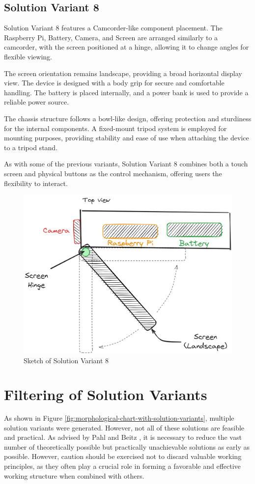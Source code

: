\subsection{Solution Variant 8}
Solution Variant 8 features a Camcorder-like component placement. The Raspberry Pi, Battery, Camera, and Screen are arranged similarly to a camcorder, with the screen positioned at a hinge, allowing it to change angles for flexible viewing.

The screen orientation remains landscape, providing a broad horizontal display view. The device is designed with a body grip for secure and comfortable handling. The battery is placed internally, and a power bank is used to provide a reliable power source.

The chassis structure follows a bowl-like design, offering protection and sturdiness for the internal components. A fixed-mount tripod system is employed for mounting purposes, providing stability and ease of use when attaching the device to a tripod stand.

As with some of the previous variants, Solution Variant 8 combines both a touch screen and physical buttons as the control mechanism, offering users the flexibility to interact.

\begin{figure}[H]
    \centering
    \includegraphics[width=0.5\linewidth]{texs/Part1/chapter3/image/v8.png}
    \caption{Sketch of Solution Variant 8}
    \label{fig:sketch-solution-variant-8}
\end{figure}

\section{Filtering of Solution Variants}
\label{sec:filtering-of-solution-variants}
As shown in Figure \ref{fig:morphological-chart-with-solution-variants}, multiple solution variants were generated. However, not all of these solutions are feasible and practical. As advised by Pahl and Beitz \cite[106-107]{Pahl2007}, it is necessary to reduce the vast number of theoretically possible but practically unachievable solutions as early as possible. However, caution should be exercised not to discard valuable working principles, as they often play a crucial role in forming a favorable and effective working structure when combined with others.

